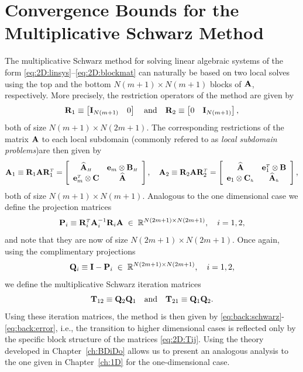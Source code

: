 \section{Convergence Bounds for the Multiplicative Schwarz Method}
\label{2D:bounds}
The multiplicative Schwarz method for solving linear algebraic systems of the
form \eqref{eq:2D:linsys}--\eqref{eq:2D:blockmat} can naturally be based on two local
solves using the top and the bottom $N(m+1)\times N(m+1)$ blocks of $\mathbf{A}$,
respectively. More precisely, the restriction operators of the method are given
by
\[
\mathbf{R}_1 \equiv \left[ \mathbf{I}_{N(m+1)} \quad 0 \right]
\quad \mbox{and} \quad
\mathbf{R}_2 \equiv \left[ 0 \quad \mathbf{I}_{N(m+1)} \right],
\]
both of size $N(m+1)\times N(2m+1)$. The corresponding restrictions of the
matrix $\mathbf{A}$ to each local subdomain (commonly refered to as \textit{local subdomain problems})are then given by
%
\begin{equation}\label{eq:2D:localsub}
\mathbf{A}_1 \equiv \mathbf{R}_1\mathbf{A} \mathbf{R}_1^{\scriptscriptstyle T}=
\left[
\begin{array}{cc}
          \widehat{\mathbf{A}}_{\scriptscriptstyle H}      &  \mathbf{e}_{m} \otimes \mathbf{B}_{\scriptscriptstyle H} \\
\mathbf{e}_{m}^{\scriptscriptstyle T} \otimes \mathbf{C}  &             \widehat{\mathbf{A}}
\end{array}
\right], \quad
\mathbf{A}_2 \equiv \mathbf{R}_2\mathbf{A} \mathbf{R}_2^{\scriptscriptstyle T}=
\left[
\begin{array}{cc}
            \widehat{\mathbf{A}}       &  \mathbf{e}_{1}^{\scriptscriptstyle T} \otimes \mathbf{B} \\
\mathbf{e}_{1} \otimes \mathbf{C}_{\scriptscriptstyle h}   &       \widehat{\mathbf{A}}_{\scriptscriptstyle h}
\end{array}
\right],
\end{equation}
%
both of size $N(m+1)\times N(m+1)$. Analogous to the one dimensional case we
define the projection matrices
%
\begin{equation}\label{eq:2D:Proj}
\mathbf{P}_i\equiv \mathbf{R}_i^{\scriptscriptstyle T}\mathbf{A}_i^{-1}\mathbf{R}_i\mathbf{A}\;\in\;
\mathbb{R}^{N(2m+1)\times N(2m+1)},
\quad i=1,2,
\end{equation}
%
and note that they are now of size ${N(2m+1)\times N(2m+1)}$. Once again, using
the complimentary projections
%
$$\mathbf{Q}_i\equiv \mathbf{I}-\mathbf{P}_i\;\in\;\mathbb{R}^{N(2m+1)\times N(2m+1)},\quad i=1,2,$$
%
we define the multiplicative Schwarz iteration matrices
%
\begin{equation}\label{eq:2D:Tij}
\mathbf{T}_{12}\equiv \mathbf{Q}_2\mathbf{Q}_1\quad\mbox{and}\quad \mathbf{T}_{21}\equiv \mathbf{Q}_1\mathbf{Q}_2.
\end{equation}
Using these iteration matrices, the method is then given by
\eqref{eq:back:schwarz}-\eqref{eq:back:error}, i.e., the transition to higher
dimensional cases is reflected only by the specific block structure of the
matrices \eqref{eq:2D:Tij}. Using the theory developed in
Chapter~\ref{ch:BDiDo} allows us to present an analogous analysis to the one
given in Chapter~\ref{ch:1D} for the one-dimensional case.

